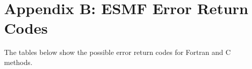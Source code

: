 %

\section{Appendix B:  ESMF Error Return Codes}

The tables below show the possible error return codes for Fortran and
C methods. 



